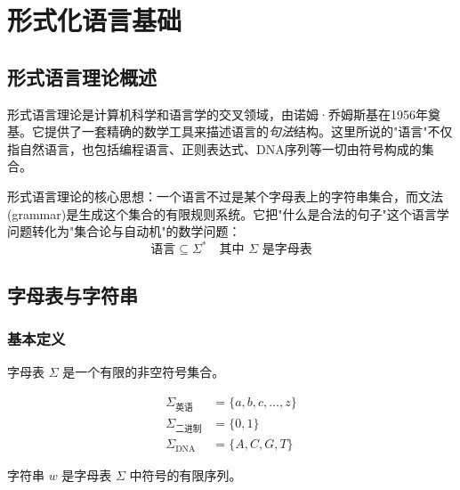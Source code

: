 \clearpage
\vspace*{\fill}
\section{形式化语言基础}
\vspace*{\fill}
\clearpage


\subsection{形式语言理论概述}

形式语言理论是计算机科学和语言学的交叉领域，由诺姆·乔姆斯基在1956年奠基。它提供了一套精确的数学工具来描述语言的\emph{句法}结构。这里所说的"语言"不仅指自然语言，也包括编程语言、正则表达式、DNA序列等一切由符号构成的集合。

形式语言理论的核心思想：一个语言不过是某个字母表上的字符串集合，而文法(grammar)是生成这个集合的有限规则系统。它把"什么是合法的句子"这个语言学问题转化为"集合论与自动机"的数学问题：
\begin{equation}
    \text{语言} \subseteq \Sigma^* \quad \text{其中 } \Sigma \text{ 是字母表}
\end{equation}

\subsection{字母表与字符串}

\subsubsection{基本定义}

\begin{definition}[字母表]
字母表 $\Sigma$ 是一个有限的非空符号集合。
\end{definition}

\begin{example}
\begin{align*}
    \Sigma_{\text{英语}} &= \{a, b, c, \ldots, z\} \\
    \Sigma_{\text{二进制}} &= \{0, 1\} \\
    \Sigma_{\text{DNA}} &= \{A, C, G, T\}
\end{align*}
\end{example}

\begin{definition}[字符串]
字符串 $w$ 是字母表 $\Sigma$ 中符号的有限序列。
\end{definition}

